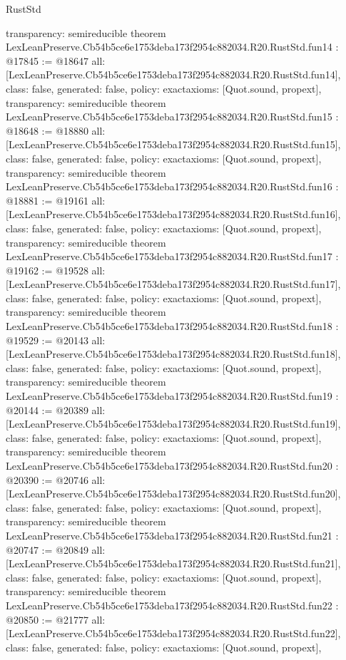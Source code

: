 \begin{lexlean}{RustStd}
\begin{coremodule}
{  transparency: semireducible
}
theorem LexLeanPreserve.Cb54b5ce6e1753deba173f2954c882034.R20.RustStd.fun14 : @17845 := @18647 {
  all: [LexLeanPreserve.Cb54b5ce6e1753deba173f2954c882034.R20.RustStd.fun14],
  class: false,
  generated: false,
  policy: exact{axioms: [Quot.sound, propext]},
  transparency: semireducible
}
theorem LexLeanPreserve.Cb54b5ce6e1753deba173f2954c882034.R20.RustStd.fun15 : @18648 := @18880 {
  all: [LexLeanPreserve.Cb54b5ce6e1753deba173f2954c882034.R20.RustStd.fun15],
  class: false,
  generated: false,
  policy: exact{axioms: [Quot.sound, propext]},
  transparency: semireducible
}
theorem LexLeanPreserve.Cb54b5ce6e1753deba173f2954c882034.R20.RustStd.fun16 : @18881 := @19161 {
  all: [LexLeanPreserve.Cb54b5ce6e1753deba173f2954c882034.R20.RustStd.fun16],
  class: false,
  generated: false,
  policy: exact{axioms: [Quot.sound, propext]},
  transparency: semireducible
}
theorem LexLeanPreserve.Cb54b5ce6e1753deba173f2954c882034.R20.RustStd.fun17 : @19162 := @19528 {
  all: [LexLeanPreserve.Cb54b5ce6e1753deba173f2954c882034.R20.RustStd.fun17],
  class: false,
  generated: false,
  policy: exact{axioms: [Quot.sound, propext]},
  transparency: semireducible
}
theorem LexLeanPreserve.Cb54b5ce6e1753deba173f2954c882034.R20.RustStd.fun18 : @19529 := @20143 {
  all: [LexLeanPreserve.Cb54b5ce6e1753deba173f2954c882034.R20.RustStd.fun18],
  class: false,
  generated: false,
  policy: exact{axioms: [Quot.sound, propext]},
  transparency: semireducible
}
theorem LexLeanPreserve.Cb54b5ce6e1753deba173f2954c882034.R20.RustStd.fun19 : @20144 := @20389 {
  all: [LexLeanPreserve.Cb54b5ce6e1753deba173f2954c882034.R20.RustStd.fun19],
  class: false,
  generated: false,
  policy: exact{axioms: [Quot.sound, propext]},
  transparency: semireducible
}
theorem LexLeanPreserve.Cb54b5ce6e1753deba173f2954c882034.R20.RustStd.fun20 : @20390 := @20746 {
  all: [LexLeanPreserve.Cb54b5ce6e1753deba173f2954c882034.R20.RustStd.fun20],
  class: false,
  generated: false,
  policy: exact{axioms: [Quot.sound, propext]},
  transparency: semireducible
}
theorem LexLeanPreserve.Cb54b5ce6e1753deba173f2954c882034.R20.RustStd.fun21 : @20747 := @20849 {
  all: [LexLeanPreserve.Cb54b5ce6e1753deba173f2954c882034.R20.RustStd.fun21],
  class: false,
  generated: false,
  policy: exact{axioms: [Quot.sound, propext]},
  transparency: semireducible
}
theorem LexLeanPreserve.Cb54b5ce6e1753deba173f2954c882034.R20.RustStd.fun22 : @20850 := @21777 {
  all: [LexLeanPreserve.Cb54b5ce6e1753deba173f2954c882034.R20.RustStd.fun22],
  class: false,
  generated: false,
  policy: exact{axioms: [Quot.sound, propext]},
}
\end{coremodule}
\end{lexlean}
